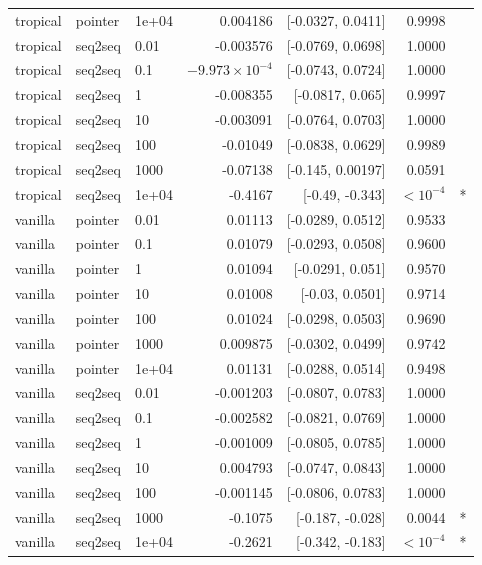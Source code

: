 \documentclass[10pt]{article}
\begin{document}
{\begin{longtable}{lllrrrl}
tropical & pointer & 1e+04 & 0.004186 & [-0.0327, 0.0411] & 0.9998 & \\
tropical & seq2seq & 0.01 & -0.003576 & [-0.0769, 0.0698] & 1.0000 & \\
tropical & seq2seq & 0.1 & $-9.973\times10^{-4}$ & [-0.0743, 0.0724] & 1.0000 & \\
tropical & seq2seq & 1 & -0.008355 & [-0.0817, 0.065] & 0.9997 & \\
tropical & seq2seq & 10 & -0.003091 & [-0.0764, 0.0703] & 1.0000 & \\
tropical & seq2seq & 100 & -0.01049 & [-0.0838, 0.0629] & 0.9989 & \\
tropical & seq2seq & 1000 & -0.07138 & [-0.145, 0.00197] & 0.0591 & \\
tropical & seq2seq & 1e+04 & -0.4167 & [-0.49, -0.343] & $<10^{-4}$ & *\\
vanilla & pointer & 0.01 & 0.01113 & [-0.0289, 0.0512] & 0.9533 & \\
vanilla & pointer & 0.1 & 0.01079 & [-0.0293, 0.0508] & 0.9600 & \\
vanilla & pointer & 1 & 0.01094 & [-0.0291, 0.051] & 0.9570 & \\
vanilla & pointer & 10 & 0.01008 & [-0.03, 0.0501] & 0.9714 & \\
vanilla & pointer & 100 & 0.01024 & [-0.0298, 0.0503] & 0.9690 & \\
vanilla & pointer & 1000 & 0.009875 & [-0.0302, 0.0499] & 0.9742 & \\
vanilla & pointer & 1e+04 & 0.01131 & [-0.0288, 0.0514] & 0.9498 & \\
vanilla & seq2seq & 0.01 & -0.001203 & [-0.0807, 0.0783] & 1.0000 & \\
vanilla & seq2seq & 0.1 & -0.002582 & [-0.0821, 0.0769] & 1.0000 & \\
vanilla & seq2seq & 1 & -0.001009 & [-0.0805, 0.0785] & 1.0000 & \\
vanilla & seq2seq & 10 & 0.004793 & [-0.0747, 0.0843] & 1.0000 & \\
vanilla & seq2seq & 100 & -0.001145 & [-0.0806, 0.0783] & 1.0000 & \\
vanilla & seq2seq & 1000 & -0.1075 & [-0.187, -0.028] & 0.0044 & *\\
vanilla & seq2seq & 1e+04 & -0.2621 & [-0.342, -0.183] & $<10^{-4}$ & *\\
\bottomrule
\end{longtable}
}
\end{document}

